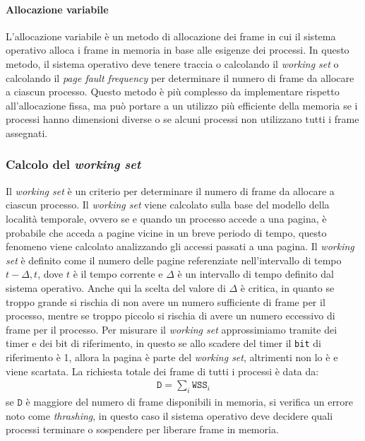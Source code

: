     \paragraph{Allocazione variabile}
        L'allocazione variabile è un metodo di allocazione dei frame in cui il sistema operativo alloca i frame in memoria in base alle esigenze dei processi. In questo metodo, il sistema operativo deve tenere traccia o calcolando il \textit{working set} o calcolando il \textit{page fault frequency} per determinare il numero di frame da allocare a ciascun processo. Questo metodo è più complesso da implementare rispetto all'allocazione fissa, ma può portare a un utilizzo più efficiente della memoria se i processi hanno dimensioni diverse o se alcuni processi non utilizzano tutti i frame assegnati.
    \subsubsection{Calcolo del \textit{working set}}
        Il \textit{working set} è un criterio per determinare il numero di frame da allocare a ciascun processo. Il \textit{working set} viene calcolato sulla base del modello della località temporale, ovvero se e quando un processo accede a una pagina, è probabile che acceda a pagine vicine in un breve periodo di tempo, questo fenomeno viene calcolato analizzando gli accessi passati a una pagina. Il \textit{working set} è definito come il numero delle pagine referenziate nell'intervallo di tempo $t-\Delta, t$, dove $t$ è il tempo corrente e $\Delta$ è un intervallo di tempo definito dal sistema operativo. Anche qui la scelta del valore di $\Delta$ è critica, in quanto se troppo grande si rischia di non avere un numero sufficiente di frame per il processo, mentre se troppo piccolo si rischia di avere un numero eccessivo di frame per il processo. Per misurare il \textit{working set} approssimiamo tramite dei timer e dei bit di riferimento, in questo se allo scadere del timer il \texttt{bit} di riferimento è 1, allora la pagina è parte del \textit{working set}, altrimenti non lo è e viene scartata.\newline
        La richiesta totale dei frame di tutti i processi è data da:
        \begin{align*}
            \texttt{D} = \sum_{i} \texttt{WSS}_i
        \end{align*}
        se $\texttt{D}$ è maggiore del numero di frame disponibili in memoria, si verifica un errore noto come \textit{thrashing}, in questo caso il sistema operativo deve decidere quali processi terminare o sospendere per liberare frame in memoria.
